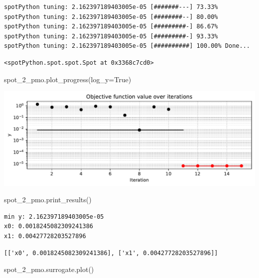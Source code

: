 \documentclass[
  letterpaper,
  DIV=11,
  numbers=noendperiod]{scrreprt}
\newenvironment{Shaded}{\begin{snugshade}}{\end{snugshade}}
\newcommand{\NormalTok}[1]{\textcolor[rgb]{0.00,0.23,0.31}{#1}}
\newcommand{\OperatorTok}[1]{\textcolor[rgb]{0.37,0.37,0.37}{#1}}
\newcommand{\VariableTok}[1]{\textcolor[rgb]{0.07,0.07,0.07}{#1}}
\begin{document}
\begin{verbatim}
spotPython tuning: 2.162397189403005e-05 [#######---] 73.33% 
spotPython tuning: 2.162397189403005e-05 [########--] 80.00% 
spotPython tuning: 2.162397189403005e-05 [#########-] 86.67% 
spotPython tuning: 2.162397189403005e-05 [#########-] 93.33% 
spotPython tuning: 2.162397189403005e-05 [##########] 100.00% Done...
\end{verbatim}

\begin{verbatim}
<spotPython.spot.spot.Spot at 0x3368c7cd0>
\end{verbatim}

\begin{Shaded}
\begin{Highlighting}[]
\NormalTok{spot\_2\_pmo.plot\_progress(log\_y}\OperatorTok{=}\VariableTok{True}\NormalTok{)}
\end{Highlighting}
\end{Shaded}

\includegraphics{015_num_spot_correlation_p_files/figure-pdf/cell-21-output-1.pdf}

\begin{Shaded}
\begin{Highlighting}[]
\NormalTok{spot\_2\_pmo.print\_results()}
\end{Highlighting}
\end{Shaded}

\begin{verbatim}
min y: 2.162397189403005e-05
x0: 0.0018245082309241386
x1: 0.00427728203527896
\end{verbatim}

\begin{verbatim}
[['x0', 0.0018245082309241386], ['x1', 0.00427728203527896]]
\end{verbatim}

\begin{Shaded}
\begin{Highlighting}[]
\NormalTok{spot\_2\_pmo.surrogate.plot()}
\end{Highlighting}
\end{Shaded}
\end{document}
